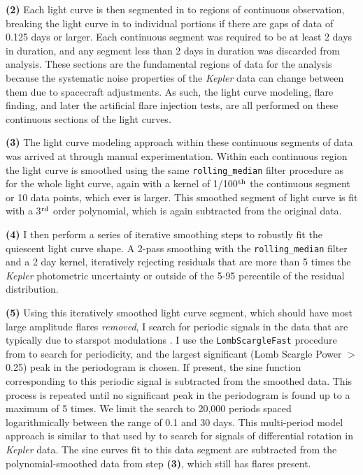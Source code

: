 \documentclass[twocolumn]{aastex6}
\newcommand{\Kepler}{\textsl{Kepler}\xspace}
\begin{document}
{\bf (2)} Each light curve is then segmented in to regions of continuous observation, breaking the light curve in to individual portions if there are gaps of data of 0.125 days or larger. Each continuous segment was required to be at least 2 days in duration, and any segment less than 2 days in duration was discarded from analysis. These sections are the fundamental regions of data for the analysis because the systematic noise properties of the \Kepler data can change between them due to spacecraft adjustments. As such, the light curve modeling, flare finding, and later the artificial flare injection tests, are all performed on these continuous sections of the light curves.

{\bf (3)} The light curve modeling approach within these continuous segments of data was arrived at through manual experimentation. Within each continuous region the light curve is smoothed using the same {\tt rolling\_median} filter procedure as for the whole light curve, again with a kernel of  1/100$^{\rm th}$ the continuous segment or 10 data points, which ever is larger. This smoothed segment of light curve is fit with a 3$^{\rm rd}$ order polynomial, which is again subtracted from the original data.

{\bf (4)} I then perform a series of iterative smoothing steps to robustly fit the quiescent light curve shape. A 2-pass smoothing with the {\tt rolling\_median} filter and a 2 day kernel, iteratively rejecting residuals that are more than 5 times the \Kepler photometric uncertainty or outside of the 5-95 percentile of the residual distribution.

{\bf (5)} Using this iteratively smoothed light curve segment, which should have most large amplitude flares {\it removed}, I search for periodic signals in the data that are typically due to starspot modulations \citep[e.g.][]{reinhold2013,davenport2015b}.  I use the {\tt LombScargleFast} procedure from \citet{gatspy} to search for periodicity, and the largest significant (Lomb Scargle Power $>$ 0.25) peak in the periodogram is chosen. If present, the sine function corresponding to this periodic signal is subtracted from the smoothed data. This process is repeated until no significant peak in the periodogram is found up to a maximum of 5 times.
We limit the search to 20,000 periods spaced logarithmically between the range of 0.1 and 30 days. This multi-period model approach is similar to that used by \citet{reinhold2013a} to search for signals of differential rotation in \Kepler data. The sine curves fit to this data segment are subtracted from the polynomial-smoothed data from step {\bf (3)}, which still has flares present.
\end{document}
